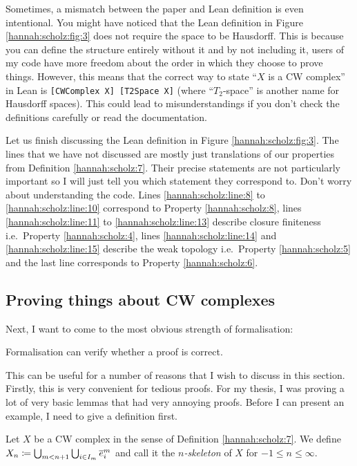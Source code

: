 Sometimes, a mismatch between the paper and Lean definition is even intentional. You might have noticed that the Lean definition in Figure \ref{hannah:scholz:fig:3} does not require the space to be Hausdorff. This is because you can define the structure entirely without it and by not including it, users of my code have more freedom about the order in which they choose to prove things. However, this means that the correct way to state ``$X$ is a CW complex'' in Lean is \lstinline[language=lean]{[CWComplex X] [T2Space X]} (where ``$T_2$-space'' is another name for Hausdorff spaces). This could lead to misunderstandings if you don't check the definitions carefully or read the documentation. 

Let us finish discussing the Lean definition in Figure \ref{hannah:scholz:fig:3}. The lines that we have not discussed are mostly just translations of our properties from Definition \ref{hannah:scholz:7}. Their precise statements are not particularly important so I will just tell you which statement they correspond to. Don't worry about understanding the code. Lines \ref{hannah:scholz:line:8} to \ref{hannah:scholz:line:10} correspond to Property \ref{hannah:scholz:8}, lines \ref{hannah:scholz:line:11} to \ref{hannah:scholz:line:13} describe closure finiteness i.e.\ Property \ref{hannah:scholz:4}, lines \ref{hannah:scholz:line:14} and \ref{hannah:scholz:line:15} describe the weak topology i.e.\ Property \ref{hannah:scholz:5} and the last line corresponds to Property \ref{hannah:scholz:6}.

\subsection*{Proving things about CW complexes}

Next, I want to come to the most obvious strength of formalisation: 

\begin{strength}\label{hannah:scholz:strength:2}
    Formalisation can verify whether a proof is correct.
\end{strength}

This can be useful for a number of reasons that I wish to discuss in this section. 
Firstly, this is very convenient for tedious proofs. For my thesis, I was proving a lot of very basic lemmas that had very annoying proofs. Before I can present an example, I need to give a definition first. 

\begin{definition}
Let $X$ be a CW complex in the sense of Definition \ref{hannah:scholz:7}. We define $X_n \coloneq \bigcup_{m < n + 1} \bigcup_{i \in I_m} \closedCell{m}{i}$ and call it the \emph{$n$-skeleton} of $X$ for $-1 \le n \le \infty$.
\end{definition}

